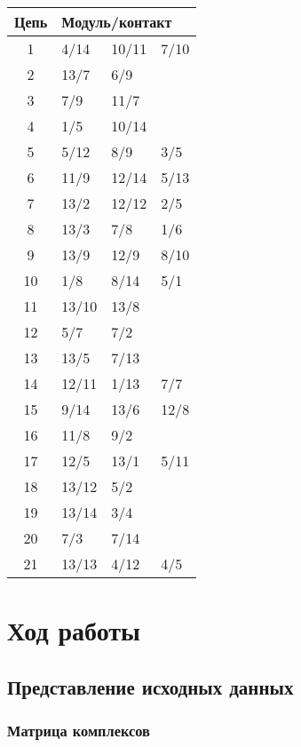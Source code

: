 \documentclass[12pt, a4paper] {ncc}
\begin{document}
\begin{tabular}{c|l l l}
Цепь & \multicolumn{3}{l}{Модуль/контакт} \\ \hline
1    & 4/14  & 10/11   & 7/10   \\
2    & 13/7  & 6/9  & \\
3    & 7/9 & 11/7 & \\
4    & 1/5   & 10/14  &       \\
5    & 5/12  & 8/9   &  3/5     \\
6    & 11/9  & 12/14  & 5/13 \\
7    & 13/2  & 12/12  & 2/5  \\
8    & 13/3  & 7/8   & 1/6  \\
9    & 13/9  & 12/9   & 8/10   \\
10   & 1/8 & 8/14   & 5/1   \\
11   & 13/10   & 13/8   &       \\
12   & 5/7 & 7/2  &   \\
13   & 13/5 & 7/13 &   \\
14   & 12/11  & 1/13 & 7/7  \\
15   & 9/14  & 13/6   &  12/8     \\
16   & 11/8 & 9/2  &   \\
17   & 12/5 & 13/1  & 5/11      \\
18   & 13/12   & 5/2   &   \\
19   & 13/14  & 3/4  &       \\
20   & 7/3 & 7/14   &       \\
21   & 13/13  & 4/12   & 4/5  \\
\end{tabular}

\section{Ход работы}

\subsection{Представление исходных данных}

\subsubsection{Матрица комплексов}
\end{document}
